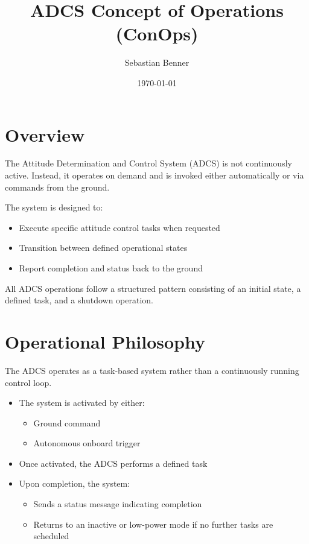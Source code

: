 \documentclass[letterpaper,11pt,oneside,english]{scrreprt}
\title{ADCS Concept of Operations (ConOps)}
\author{Sebastian Benner}
\date{\today}
\begin{document}
	
	\maketitle
	\tableofcontents
	\newpage
	
	\chapter{Overview}
	
	The Attitude Determination and Control System (ADCS) is not continuously active. Instead, it operates on demand and is invoked either automatically or via commands from the ground.
	
	The system is designed to:
	
	\begin{itemize}
		\item Execute specific attitude control tasks when requested
		\item Transition between defined operational states
		\item Report completion and status back to the ground
	\end{itemize}
	
	All ADCS operations follow a structured pattern consisting of an initial state, a defined task, and a shutdown operation.
	
	\chapter{Operational Philosophy}
	
	The ADCS operates as a task-based system rather than a continuously running control loop.
	
	\begin{itemize}
		\item The system is activated by either:
		\begin{itemize}
			\item Ground command
			\item Autonomous onboard trigger
		\end{itemize}
		
		\item Once activated, the ADCS performs a defined task
		
		\item Upon completion, the system:
		\begin{itemize}
			\item Sends a status message indicating completion
			\item Returns to an inactive or low-power mode if no further tasks are scheduled
		\end{itemize}
	\end{itemize}
	
\end{document}
